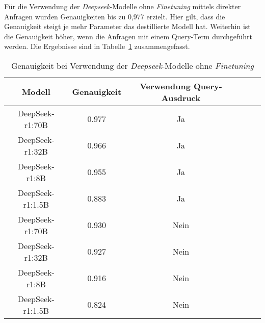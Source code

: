 Für die Verwendung der \textit{Deepseek}-Modelle ohne \textit{Finetuning} mittels direkter Anfragen wurden Genauigkeiten bis zu 0,977 erzielt.
Hier gilt, dass die Genauigkeit steigt je mehr Parameter das destillierte Modell hat.
Weiterhin ist die Genauigkeit höher, wenn die Anfragen mit einem Query-Term durchgeführt werden.
Die Ergebnisse sind in Tabelle~\ref{tab:deepseek-results} zusammengefasst.
\begin{table}
    \begin{tabular}{cccccc}
        \toprule
        Modell           & Genauigkeit & Verwendung Query-Ausdruck\\
        \midrule
        DeepSeek-r1:70B  & 0.977       & Ja \\
        DeepSeek-r1:32B  & 0.966       & Ja \\
        DeepSeek-r1:8B   & 0.955       & Ja \\
        DeepSeek-r1:1.5B & 0.883       & Ja \\
        DeepSeek-r1:70B  & 0.930       & Nein \\
        DeepSeek-r1:32B  & 0.927       & Nein \\
        DeepSeek-r1:8B   & 0.916       & Nein \\
        DeepSeek-r1:1.5B & 0.824       & Nein \\
        \bottomrule
    \end{tabular}
    \caption{Genauigkeit bei Verwendung der \textit{Deepseek}-Modelle ohne \textit{Finetuning}}
    \label{tab:deepseek-results}
\end{table}
